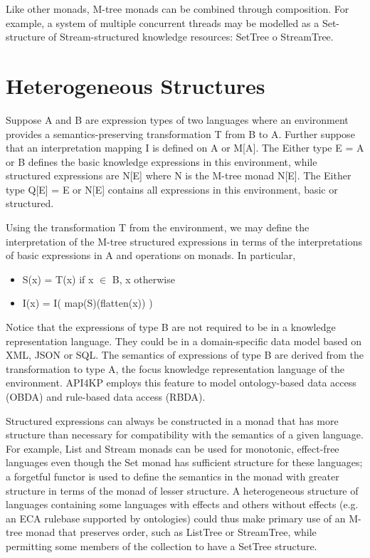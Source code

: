 \documentclass[runningheads]{llncs}
\begin{document}
Like other monads, M-tree monads can be combined through composition.
For example, a system of multiple concurrent threads may be modelled as a Set-structure of Stream-structured knowledge resources: SetTree o StreamTree.


\section{Heterogeneous Structures}
Suppose A and B are expression types of two languages where an environment provides a semantics-preserving transformation T from B to A.
Further suppose that an interpretation mapping I is defined on A or M[A].
The Either type E = A or B defines the basic knowledge expressions in this environment, while structured expressions are N[E] where N is the M-tree monad  N[E].
The Either type Q[E] = E or N[E] contains all expressions in this environment, basic or structured. 

Using the transformation T from the environment, we may define the interpretation of the M-tree structured expressions in terms of the interpretations of basic expressions in A and operations on monads. In particular,
\begin{itemize}
\item S(x) = T(x) if x $\in$ B, x otherwise
\item I(x) = I( map(S)(flatten(x)) )
\end{itemize}
Notice that the expressions of type B are not required to be in a knowledge representation language. They could be in a domain-specific data model based on XML, JSON or SQL. The semantics of expressions of type B are derived from the transformation to type A, the focus  knowledge representation language of the environment. API4KP employs this feature to model ontology-based data access (OBDA) and rule-based data access (RBDA).

Structured expressions can always be constructed in a monad that has more structure than necessary for compatibility with the semantics of a given language.
For example, List and Stream monads can be used for monotonic, effect-free languages even though the Set monad has sufficient structure for these languages;
a forgetful functor is used to define the semantics in the monad with greater structure in terms of the monad of lesser structure.
A heterogeneous structure of languages containing some languages with effects and others without effects (e.g. an ECA rulebase supported by ontologies) could thus make primary use of an M-tree monad that preserves order, such as ListTree or StreamTree, while permitting some members of the collection to have a SetTree structure. 
%
\end{document}

